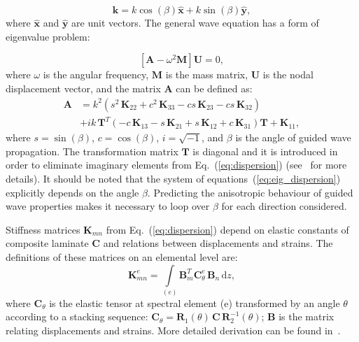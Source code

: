 \documentclass[preprint,12pt]{elsarticle}
\newcommand{\matr}[1]{\mathbf{#1}} %
\newcommand{\vect}[1]{\mathbf{#1}} %
\newcommand{\ud}{\mathrm{d}}
\begin{document}
\begin{equation}
	\vect{k} = k \cos (\beta)\hat{ \vect{x}} + k \sin (\beta) \hat{\vect{y}},
	\label{eq:wavevector}
\end{equation}
where \(\hat{ \vect{x}}\) and \(\hat{\vect{y}}\) are unit vectors. 	
The general wave equation has a form of eigenvalue problem:

\begin{equation}
	\left[\matr{A} - \omega^2\matr{M} \right] \vect{U} =0,
	\label{eq:eig_dispersion}
\end{equation}
where $\omega$ is the angular frequency, $\matr{M}$ is the mass matrix, $\matr{U}$ is the nodal displacement vector, and the matrix $\matr{A}$ can be defined as:
\begin{equation}
	\begin{aligned}
	\matr{A} & =  k^2\left(s^2 \,\matr{K}_{22} + c^2\, \matr{K}_{33} - c s\, \matr{K}_{23} - c s\, \matr{K}_{32}\right) \\
	& + i k\, \matr{T}^T\left(-c\, \matr{K}_{13} - s\, \matr{K}_{21} + s\, \matr{K}_{12} + c\, \matr{K}_{31}\right) \matr{T} +\matr{K}_{11},
	\end{aligned}
	\label{eq:dispersion}
\end{equation}
where  $s = \sin(\beta)$, $c = \cos(\beta)$, $i = \sqrt{-1}$, and $\beta$ is the angle of guided wave propagation. 
The transformation matrix $\matr{T}$ is diagonal and it is introduced in order to eliminate imaginary elements from Eq.~(\ref{eq:dispersion}) (see~\cite{Bartoli2006} for more details). 
It should be noted that the system of equations~(\ref{eq:eig_dispersion}) explicitly depends on the angle $\beta$. 
Predicting the anisotropic behaviour of guided wave properties makes it necessary to loop over $\beta$ for each direction considered.

Stiffness matrices $\matr{K}_{mn}$ from Eq.~(\ref{eq:dispersion}) depend on elastic constants of composite laminate $\matr{C}$ and relations between displacements and strains. 
The definitions of these matrices on an elemental level are:
\begin{equation}
	\matr{K}_{mn}^e= \int \limits_{(e)} \matr{B}_m^{T} \matr{C}_{\theta}^e \, \matr{B}_n\, \ud z, 
	\label{eq:stiffness_matrix_e}
\end{equation}
where \(\matr{C}_{\theta}\) is the elastic tensor at spectral element (e) transformed by an angle \(\theta\) according to a stacking sequence: $ \matr{C}_{\theta}= \matr{R}_1(\theta) \,\matr{C} \,\matr{R}_2^{-1}(\theta)$; \(\matr{B}\) is the matrix relating displacements and strains.
More detailed derivation can be found in~\cite{Kudela2020}. 
\end{document}
